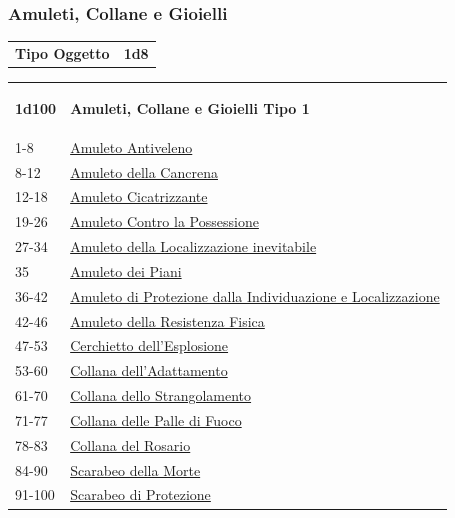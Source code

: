 \begin{multicols}{2}
{\subsubsection{Amuleti, Collane e Gioielli}\hypertarget{amuleticollanegioielli}{}\label{amuleticollanegioielli}


{\small\begin{tabular}{ll}
\textbf{Tipo Oggetto}&\textbf{1d8}\\
\end{tabular}}

\medskip

{\small\begin{tabularx}{0.45\textwidth}{lX}\hypertarget{amuleticollanegioielli1}{}
\textbf{1d100} & \textbf{Amuleti, Collane e Gioielli Tipo 1}\\
1-8 & \hyperlink{AmuletoAntiveleno}{Amuleto Antiveleno}\\
8-12& \hyperlink{AmuletodellaCancrena}{Amuleto della Cancrena}\\
12-18 & \hyperlink{AmuletoCicatrizzante}{Amuleto Cicatrizzante}\\
19-26 & \hyperlink{AmuletoControlaPossessione}{Amuleto Contro la Possessione}\\
27-34 & \hyperlink{AmuletodellaLocalizzazioneinevitabile}{Amuleto della Localizzazione inevitabile}\\
35& \hyperlink{Amuleto dei Piani}{Amuleto dei Piani}\\
36-42 & \hyperlink{AmuletodiProtezionedallaIndividuazioneeLocalizzazione}{Amuleto di Protezione dalla Individuazione e Localizzazione}\\
42-46 & \hyperlink{AmuletodellaResistenzaFisica}{Amuleto della Resistenza Fisica}\\
47-53 & \hyperlink{Cerchiettodell'Esplosione}{Cerchietto dell'Esplosione}\\
53-60 & \hyperlink{Collanadell'Adattamento}{Collana dell'Adattamento}\\
61-70 & \hyperlink{CollanadelloStrangolamento}{Collana dello Strangolamento}\\
71-77 & \hyperlink{CollanadellePallediFuoco}{Collana delle Palle di Fuoco}\\
78-83 & \hyperlink{CollanadelRosario}{Collana del Rosario}\\
84-90 & \hyperlink{ScarabeodellaMorte}{Scarabeo della Morte}\\
91-100& \hyperlink{ScarabeodiProtezione}{Scarabeo di Protezione}
\end{tabularx}}

}
\end{multicols}
